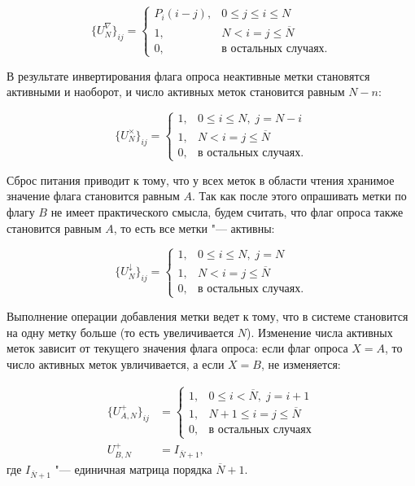 \begin{equation}\label{eq:ch3_bg_inventory}
	\{ U_N^\nabla \}_{ij} = \begin{cases}
		P_i(i - j), & 0 \leqslant j \leqslant i \leqslant N\\
		1,          & N < i = j \leqslant \overline{N}\\
		0,          & \text{в остальных случаях.}
 	\end{cases}
\end{equation}

В результате инвертирования флага опроса неактивные метки становятся активными и наоборот, и число активных меток становится равным $N - n$:

\begin{equation}\label{eq:ch3_bg_switch}
	\{ U_N^\times \}_{ij} = \begin{cases}
 		1, & 0 \leqslant i \leqslant N,\; j = N - i\\
 		1, & N < i = j \leqslant \overline{N}\\
 		0, & \text{в остальных случаях.}
 	\end{cases}
\end{equation}

Сброс питания приводит к тому, что у всех меток в области чтения хранимое значение флага становится равным $A$. Так как после этого опрашивать метки по флагу $B$ не имеет практического смысла, будем считать, что флаг опроса также становится равным $A$, то есть все метки "--- активны:

\begin{equation}\label{eq:ch3_bg_power_off}
	\{ U_N^\downarrow \}_{ij} = \begin{cases}
 		1, & 0 \leqslant i \leqslant N,\; j = N\\
 		1, & N < i = j \leqslant \overline{N}\\
 		0, & \text{в остальных случаях.}
 	\end{cases}
\end{equation}

Выполнение операции добавления метки ведет к тому, что в системе становится на одну метку больше (то есть увеличивается $N$). Изменение числа активных меток зависит от текущего значения флага опроса: если флаг опроса $X = A$, то число активных меток увличивается, а если $X = B$, не изменяется:

\begin{equation}\label{eq:ch3_bg_tag_arrival}
	\begin{aligned}
		\{ U_{A,N}^+ \}_{ij} &= \begin{cases}
			1, & 0 \leqslant i < \overline{N}, \; j = i + 1\\
			1, & N+1 \leqslant i = j \leqslant \overline{N}\\
			0, & \text{в остальных случаях}
	 	\end{cases}\\
		U_{B,N}^+ &= I_{\overline{N}+1},
 	\end{aligned}
\end{equation}
где $I_{\overline{N}+1}$ "--- единичная матрица порядка $\overline{N}+1$.

